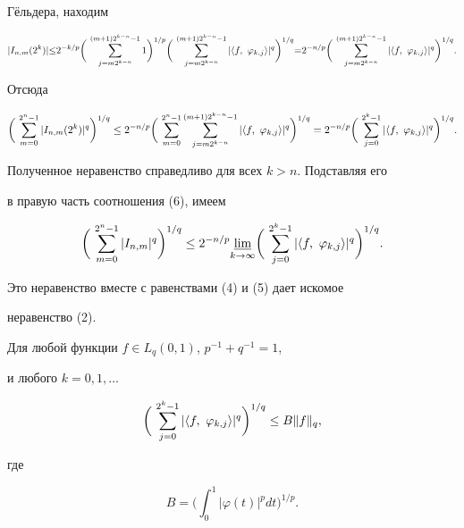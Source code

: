 \begin{pf}
Г\"ельдера, находим 


$$ 


|I_{n,m}(2^k)|{\le}2^{-k/p}\bigg(\, 


\sum^{(m+1)2^{k-n}-1}_{j=m2^{k-n}}1\bigg)^{1/p}\bigg(\, 


\sum^{(m+1)2^{k-n}-1}_{j=m2^{k-n}}|\la f,\ \varphi_{k,j}\ra 


|^q\bigg)^{1/q}{=}2^{-n/p}\bigg(\, 


\sum^{(m+1)2^{k-n}-1}_{j=m2^{k-n}} 


|\la f,\ \varphi_{k,j}\ra|^q\bigg)^{1/q}.


$$ 


Отсюда 


$$ 


\bigg(\,\sum^{2^n-1}_{m=0}|I_{n,m}(2^k)|^q\bigg)^{1/q}\le 


2^{-n/p}\bigg(\,\sum^{2^n-1}_{m=0} 


\sum^{(m+1)2^{k-n}-1}_{j=m2^{k-n}} 


|\la f,\ \varphi_{k,j}\ra|^q\bigg)^{1/q}= 


2^{-n/p}\bigg(\,\sum^{2^k-1}_{j=0}|\la f,\ \varphi_{k,j} 


\ra|^q\bigg)^{1/q}. 


$$ 


Полученное неравенство справедливо для всех $k>n$. Подставляя его 


в правую часть соотношения (6), имеем 


$$ 


\bigg(\,\sum^{2^n-1}_{m=0}|I_{n,m}|^q\bigg)^{1/q} 


\le 2^{-n/p}\underset{k\to\infty}{\varliminf}\bigg(\, 


\sum^{2^k-1}_{j=0}|\la f,\ \varphi_{k,j}\ra|^q\bigg)^{1/q}. 


$$ 


Это неравенство вместе с равенствами (4) и (5) дает искомое 


неравенство (2). 


\end{pf} 


 


\begin{prop} Для любой функции $f\in L_q(0,1)$, $p^{-1}+q^{-1}=1$, 


и любого $k=0,1,\dotsc$ 


$$ 


\bigg(\,\sum^{2^k-1}_{j=0}|\la f,\ \varphi_{k,j}\ra|^q\bigg)^{1/q} 


\le B\|f\|_q, 


$$ 


где 


$$ 


B=\bigg(\int^1_0|\varphi(t)|^p dt\bigg)^{1/p}. 


$$ 


\end{prop} 


